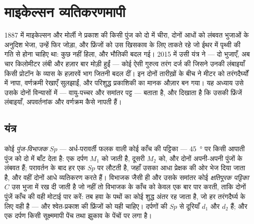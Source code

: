 \chapter{माइकेल्सन व्यतिकरणमापी}\label{ch:b2:michelson}

1887 में माइकेल्सन और मोर्ली ने प्रकाश की किसी पुंज को दो में चीरा, दोनों
आधों को लंबवत भुजाओं के अनुदिश भेजा, उन्हें फिर जोड़ा, और फ्रिंजों को उस
खिसकाव के लिए ताकते रहे जो ईथर में पृथ्वी की गति से होना चाहिए था: कुछ नहीं
हिला, और भौतिकी बदल गई। 2015 में उसी यंत्र ने --- दो भुजाएँ, अब चार
किलोमीटर लंबी और हज़ार बार मोड़ी हुईं --- कोई ऐसी गुरुत्व तरंग दर्ज की जिसने
उनकी लंबाइयाँ किसी प्रोटॉन के व्यास के हज़ारवें भाग जितनी बदल दीं। इन दोनों
तारीख़ों के बीच  ने मीटर को तरंगदैर्घ्यों में नापा,
वर्णक्रमी रेखाएँ सुलझाईं, और परिशुद्ध प्रकाशिकी का मानक औज़ार बन गया।
यह अध्याय उसे उसके दोनों विन्यासों में --- वायु-पच्चर और
समांतर पट्ट --- बताता है, और दिखाता है कि उसकी फ्रिंजें लंबाइयाँ,
अपवर्तनांक और वर्णक्रम कैसे नापती हैं।

\section{यंत्र}

\begin{definition}[माइकेल्सन व्यतिकरणमापी]\label{def:b2:michelson:instrument}
कोई \emph{पुंज-विभाजक} $Sp$ --- अर्ध-परावर्ती फलक वाली कोई काँच की पट्टिका
--- \qty{45}{\degree} पर किसी आपाती पुंज को दो में बाँट देता है: एक दर्पण
$M_1$ को जाती है, दूसरी $M_2$ को, और दोनों अपनी-अपनी पुंजों के लंबवत हैं;
परावर्तन के बाद हर एक $Sp$ पर लौटती है, जहाँ उसका आधा प्रेक्षक की ओर भेज
दिया जाता है, और वहीं दोनों आधे व्यतिकरण करते हैं। विभाजक जैसी ही और उसके
समांतर कोई \emph{क्षतिपूरक पट्टिका} $C$ उस भुजा में रख दी जाती है जो
नहीं तो विभाजक के काँच को केवल एक बार पार करती, ताकि दोनों
पुंजें काँच की वही मोटाई पार करें: तब  हवा के पथों का
कोई शुद्ध अंतर रह जाता है, जो हर तरंगदैर्घ्य के लिए वही है --- और
श्वेत-प्रकाश की फ्रिंजों को यही चाहिए। दर्पणों की $Sp$ से दूरियाँ $d_1$
और $d_2$ हैं; और एक दर्पण किसी सूक्ष्ममापी पेंच तथा झुकाव के पेंचों पर
लगा है।
\end{definition}

